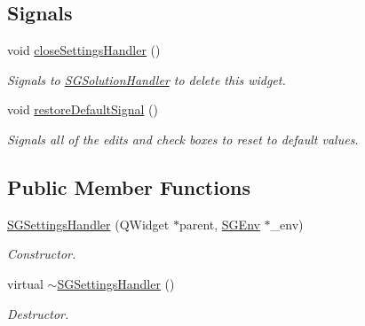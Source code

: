 \subsection*{Signals}
\begin{DoxyCompactItemize}
\item 
\mbox{\label{classSGSettingsHandler_aca692bb3755deb5ef9a60c4c7fc54385}} 
void \hyperlink{classSGSettingsHandler_aca692bb3755deb5ef9a60c4c7fc54385}{close\+Settings\+Handler} ()
\begin{DoxyCompactList}\small\item\em Signals to \hyperlink{classSGSolutionHandler}{S\+G\+Solution\+Handler} to delete this widget. \end{DoxyCompactList}\item 
\mbox{\label{classSGSettingsHandler_a618f1f8869fc978b80d3c31a76426df9}} 
void \hyperlink{classSGSettingsHandler_a618f1f8869fc978b80d3c31a76426df9}{restore\+Default\+Signal} ()
\begin{DoxyCompactList}\small\item\em Signals all of the edits and check boxes to reset to default values. \end{DoxyCompactList}\end{DoxyCompactItemize}
\subsection*{Public Member Functions}
\begin{DoxyCompactItemize}
\item 
\mbox{\label{classSGSettingsHandler_a78a84bb8e78f27e8e3c92d7ee37b9085}} 
\hyperlink{classSGSettingsHandler_a78a84bb8e78f27e8e3c92d7ee37b9085}{S\+G\+Settings\+Handler} (Q\+Widget $\ast$parent, \hyperlink{classSGEnv}{S\+G\+Env} $\ast$\+\_\+env)
\begin{DoxyCompactList}\small\item\em Constructor. \end{DoxyCompactList}\item 
\mbox{\label{classSGSettingsHandler_a45045c6c753ac23f0a6104e6d2b35500}} 
virtual \hyperlink{classSGSettingsHandler_a45045c6c753ac23f0a6104e6d2b35500}{$\sim$\+S\+G\+Settings\+Handler} ()
\begin{DoxyCompactList}\small\item\em Destructor. \end{DoxyCompactList}\end{DoxyCompactItemize}
